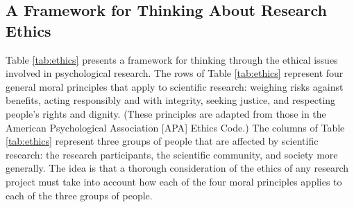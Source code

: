 \documentclass[
]{krantz}
\begin{document}
\subsection*{A Framework for Thinking About Research Ethics}\label{a-framework-for-thinking-about-research-ethics}


Table \ref{tab:ethics} presents a framework for thinking through the ethical issues involved in psychological research. The rows of Table \ref{tab:ethics} represent four general moral principles that apply to scientific research: weighing risks against benefits, acting responsibly and with integrity, seeking justice, and respecting people's rights and dignity. (These principles are adapted from those in the American Psychological Association {[}APA{]} Ethics Code.) The columns of Table \ref{tab:ethics} represent three groups of people that are affected by scientific research: the research participants, the scientific community, and society more generally. The idea is that a thorough consideration of the ethics of any research project must take into account how each of the four moral principles applies to each of the three groups of people.
\end{document}
